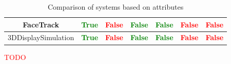\begin{table}[h!]
{\begin{tabular}{|c|c|c|c|c|c|c|}
        \hline 
        FaceTrack \cite{10.1109/3DUI.2008.4476617} & \textbf{\textcolor{Green}{True}} & \textbf{\textcolor{red}{False}} & \textbf{\textbf{\textcolor{Green}{False}}} & \textbf{\textcolor{Green}{False}} & \textbf{\textcolor{red}{False}} & \textbf{\textcolor{red}{False}}  \\
        \hline
		3DDisplaySimulation \cite{Zabarauskas2012} & \textbf{\textcolor{Green}{True}} & \textbf{\textcolor{red}{False}} & \textbf{\textbf{\textcolor{Green}{False}}} & \textbf{\textcolor{Green}{False}} & \textbf{\textcolor{red}{False}} & \textbf{\textcolor{red}{False}}  \\
        \hline
    \end{tabular}}
    \caption{Comparison of systems based on attributes}
    \label{table:comparison}
\end{table}

\textcolor{red}{TODO}